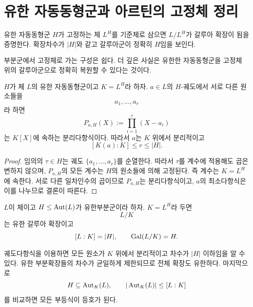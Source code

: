 \clearpage
\section{유한 자동동형군과 아르틴의 고정체 정리}
\label{sec:artin-fixed-field}

\begin{learninggoal}
유한 자동동형군 $H$가 고정하는 체 $L^H$를 기준체로 삼으면 $L/L^H$가 갈루아 확장이 됨을 증명한다. 확장차수가 $|H|$와 같고 갈루아군이 정확히 $H$임을 보인다.
\end{learninggoal}

부분군에서 고정체로 가는 구성은 쉽다. 더 깊은 사실은 유한한 자동동형군을 고정체 위의 갈루아군으로 정확히 복원할 수 있다는 것이다.

\begin{lemma}[궤도다항식]
$H$가 체 $L$의 유한 자동동형군이고 $K=L^H$라 하자. $a\in L$의 $H$-궤도에서 서로 다른 원소들을
\[
  a_1,\dots,a_r
\]
라 하면
\[
  P_{a,H}(X)
  :=\prod_{i=1}^r(X-a_i)
\]
는 $K[X]$에 속하는 분리다항식이다. 따라서 $a$는 $K$ 위에서 분리적이고
\[
  [K(a):K]\le r\le |H|.
\]
\end{lemma}

\begin{proof}
임의의 $\tau\in H$는 궤도 $\{a_1,\dots,a_r\}$를 순열한다. 따라서 $\tau$를 계수에 적용해도 곱은 변하지 않으며, $P_{a,H}$의 모든 계수는 $H$의 원소들에 의해 고정된다. 즉 계수는 $K=L^H$에 속한다. 서로 다른 일차인수의 곱이므로 $P_{a,H}$는 분리다항식이고, $a$의 최소다항식은 이를 나누므로 결론이 따른다.
\end{proof}

\begin{theorem}
$L$이 체이고 $H\le\operatorname{Aut}(L)$가 유한부분군이라 하자. $K=L^H$라 두면
\[
  L/K
\]
는 유한 갈루아 확장이고
\[
  [L:K]=|H|,
  \qquad
  \operatorname{Gal}(L/K)=H.
\]
\end{theorem}

\begin{proofidea}
궤도다항식을 이용하면 모든 원소가 $K$ 위에서 분리적이고 차수가 $|H|$ 이하임을 알 수 있다. 유한 부분확장들의 차수가 균일하게 제한되므로 전체 확장도 유한하다. 마지막으로
\[
  H\subseteq\operatorname{Aut}_K(L),
  \qquad
  |\operatorname{Aut}_K(L)|\le[L:K]
\]
를 비교하면 모든 부등식이 등호가 된다.
\end{proofidea}

